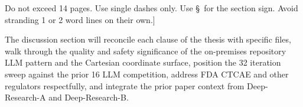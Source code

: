 \begin{sectionaccent}
Do not exceed 14 pages. Use single dashes only. Use \S\ for the
section sign. Avoid stranding 1 or 2 word lines on their own.]

The discussion section will reconcile each clause of the thesis with
specific files, walk through the quality and safety significance of
the on-premises repository LLM pattern and the Cartesian coordinate
surface, position the 32 iteration sweep against the prior 16 LLM
competition, address FDA CTCAE and other regulators respectfully, and
integrate the prior paper context from Deep-Research-A and
Deep-Research-B.


\end{sectionaccent}
